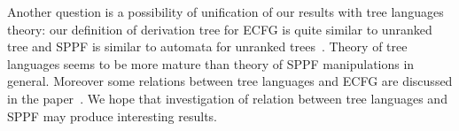 \documentclass[runningheads,a4paper]{llncs}
\begin{document}
Another question is a possibility of unification of our results with tree languages theory: our definition of derivation tree for ECFG is quite similar to unranked tree and SPPF is similar to automata for unranked trees~\cite{TATA}.
Theory of tree languages seems to be more mature than theory of SPPF manipulations in general.
Moreover some relations between tree languages and ECFG are discussed in the paper~\cite{TreeLangAndECFG}.
We hope that investigation of relation between tree languages and SPPF may produce interesting results.





\end{document}
